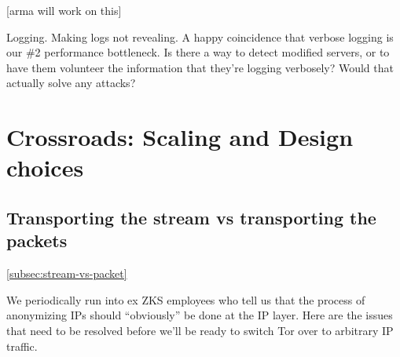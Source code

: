 \documentclass{llncs}
\begin{document}
[arma will work on this]


Logging. Making logs not revealing. A happy coincidence that verbose
logging is our \#2 performance bottleneck. Is there a way to detect
modified servers, or to have them volunteer the information that they're
logging verbosely? Would that actually solve any attacks?

\section{Crossroads: Scaling and Design choices}
\label{sec:crossroads-design}

\subsection{Transporting the stream vs transporting the packets}
\ref{subsec:stream-vs-packet}

We periodically run into ex ZKS employees who tell us that the process of
anonymizing IPs should ``obviously'' be done at the IP layer. Here are
the issues that need to be resolved before we'll be ready to switch Tor
over to arbitrary IP traffic.
\end{document}

